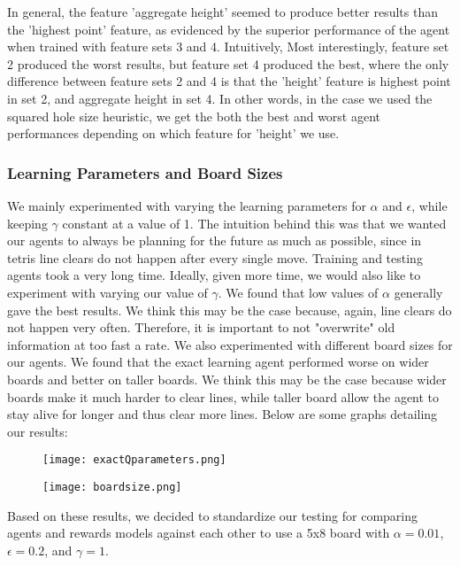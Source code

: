 \documentclass[10pt]{article}
\begin{document}
In general, the feature 'aggregate height' seemed to produce better results than the 'highest point' feature, as evidenced by the superior performance of the agent when trained with feature sets 3 and 4. Intuitively, Most interestingly, feature set 2 produced the worst results, but feature set 4 produced the best, where the only difference between feature sets 2 and 4 is that the 'height' feature is highest point in set 2, and aggregate height in set 4. In other words, in the case we used the squared hole size heuristic, we get the both the best and worst agent performances depending on which feature for 'height' we use.

\subsubsection{Learning Parameters and Board Sizes}
We mainly experimented with varying the learning parameters for $\alpha$ and $\epsilon$, while keeping $\gamma$ constant at a value of 1. The intuition behind this was that we wanted our agents to always be planning for the future as much as possible, since in tetris line clears do not happen after every single move. Training and testing agents took a very long time. Ideally, given more time, we would also like to experiment with varying our value of $\gamma$. We found that low values of $\alpha$ generally gave the best results. We think this may be the case because, again, line clears do not happen very often. Therefore, it is important to not "overwrite" old information at too fast a rate. We also experimented with different board sizes for our agents. We found that the exact learning agent performed worse on wider boards and better on taller boards. We think this may be the case because wider boards make it much harder to clear lines, while taller board allow the agent to stay alive for longer and thus clear more lines. Below are some graphs detailing our results:
\begin{figure}[H]
  \centering
  \begin{minipage}[b]{0.4\textwidth}
    \texttt{[image: exactQparameters.png]}
  \end{minipage}
  \hfill
  \begin{minipage}[b]{0.4\textwidth}
    \texttt{[image: boardsize.png]}
  \end{minipage}
\end{figure}
Based on these results, we decided to standardize our testing for comparing agents and rewards models against each other to use a 5x8 board with $\alpha=0.01$, $\epsilon=0.2$, and $\gamma=1$.
\end{document}
